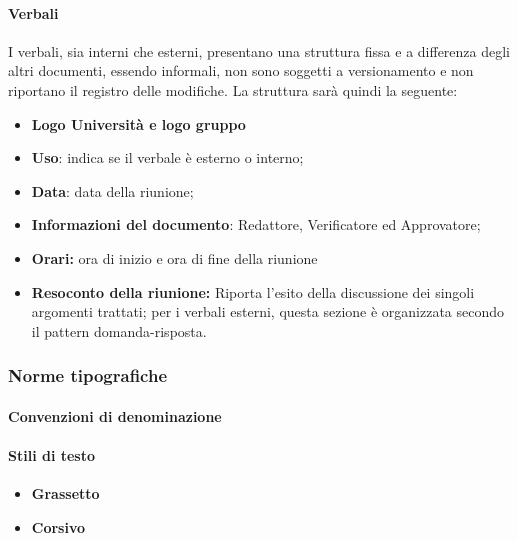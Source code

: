 		\paragraph{Verbali} %
		\aCapo{}  
			I verbali, sia interni che esterni, presentano una struttura fissa e a differenza degli altri documenti, essendo informali, non sono soggetti a versionamento e non riportano il registro delle modifiche.
			La struttura sarà quindi la seguente:
				\begin{itemize}
					\item \textbf{Logo Università e logo gruppo}
					\item \textbf{Uso}: indica se il verbale è esterno o interno;
					\item \textbf{Data}: data della riunione;
					\item \textbf{Informazioni del documento}: Redattore, Verificatore ed Approvatore;
					\item \textbf{Orari:} ora di inizio e ora di fine della riunione
					\item \textbf{Resoconto della riunione:} Riporta l'esito della discussione dei singoli argomenti trattati; per i verbali esterni, questa sezione è organizzata secondo il pattern domanda-risposta.								
				\end{itemize}
	
	\subsubsection{Norme tipografiche}
		\paragraph{Convenzioni di denominazione}   
		\aCapo{}  
		\paragraph{Stili di testo} %
		\aCapo{}  
			\begin{itemize}
				\item \textbf{Grassetto}
				\item \textbf{Corsivo}
			\end{itemize}
	
						
		
